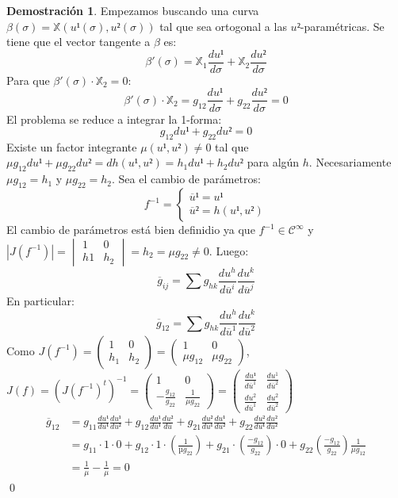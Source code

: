 \documentclass[twoside]{report}
\theoremstyle{definition}
\newtheorem*{dem}{Demostración}
\numberwithin{equation}{section}
\newcommand{\X}{\mathbb{X}}
\begin{document}
\begin{dem}
Empezamos buscando una curva $β(σ)=\X(u¹(σ),u²(σ))$ tal que sea ortogonal a las $u²$-paramétricas. Se tiene que el vector tangente a $β$ es:
\[ β'(σ) = \X_1 \frac{du¹}{dσ}+\X_2 \frac{du²}{dσ} \]
Para que $β'(σ) \cdot \X_2 = 0$:
\[ β'(σ) \cdot \X_2 = g_{12} \frac{du¹}{dσ} + g_{22} \frac{du²}{dσ} = 0 \]
El problema se reduce a integrar la 1-forma:
\[ g_{12} du¹ + g_{22} du² = 0 \]
Existe un factor integrante $μ(u¹,u²)\neq 0$ tal que $μ g_{12} du¹+μ g_{22} du² = dh(u¹,u²)=h_1 du¹+h_2 du²$ para algún $h$. Necesariamente $μ g_{12} = h_1$ y $μ g_{22} = h_2$. Sea el cambio de parámetros:
\[ f^{-1} = \begin{cases}
	\overline{u}¹ = u¹\\
	\overline{u}² = h(u¹,u²)
\end{cases}\]
El cambio de parámetros está bien definidio ya que $f^{-1} \in \mathcal{C}^\infty$ y $|J(f^{-1})| = \begin{vmatrix}1 & 0\\h1 & h_2\end{vmatrix} = h_2 = μ g_{22} \neq 0$. Luego:
\[ \overline{g}_{ij} = \sum g_{hk} \frac{du^h}{d\overline{u}^i} \frac{du^k}{d\overline{u}^j}\]
En particular:
\[ \overline{g}_{12} = \sum g_{hk} \frac{du^h}{d\overline{u}^1} \frac{du^k}{d\overline{u}^2} \]
Como $J(f^{-1}) = \begin{pmatrix}1 & 0\\h_1 & h_2\end{pmatrix} = \begin{pmatrix}1 & 0\\μ g_{12} & μ g_{22}\end{pmatrix}$, $J(f) = (J(f^{-1})^t)^{-1} = \begin{pmatrix}1 & 0 \\ -\frac{g_{12}}{g_{22}} & \frac{1}{μg_{22}}\end{pmatrix} = \begin{pmatrix}\frac{du¹}{d\overline{u}^1} & \frac{du^1}{d\overline{u}^2}\\\frac{du^2}{d\overline{u}^1} & \frac{du^2}{d\overline{u}^2}\end{pmatrix}$
\begin{align*}
	\overline{g}_{12} & = g_{11} \frac{du¹}{d\overline{u}¹} \frac{du¹}{d\overline{u}²} + g_{12} \frac{du¹}{d\overline{u}¹} \frac{du²}{d\overline{u}} + g_{21} \frac{du²}{d\overline{u}¹} \frac{du¹}{d\overline{u}²} + g_{22} \frac{du²}{d\overline{u}¹} \frac{du²}{d\overline{u}²} \\
	& = g_{11} \cdot 1 \cdot 0 + g_{12} \cdot 1 \cdot \left(\frac{1}{µ g_{22}}\right) + g_{21} \cdot \left( \frac{-g_{12}}{g_{22}}\right) \cdot 0  + g_{22} \left(\frac{-g_{12}}{g_{22}}\right) \frac{1}{μ g_{12}} \\
	& = \frac{1}{μ} - \frac{1}{μ} = 0
\end{align*}
\qed
\end{dem}
\end{document}
